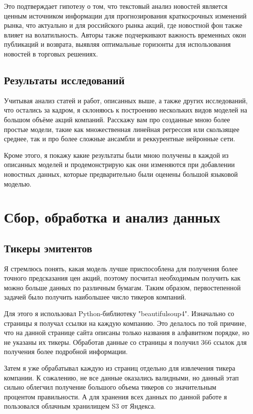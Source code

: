 \documentclass[12pt, a4paper]{article}
\begin{document}
Это подтверждает гипотезу о том, что текстовый анализ новостей является ценным источником информации для прогнозирования краткосрочных изменений рынка, что актуально и для российского рынка акций, где новостной фон также влияет на волатильность. Авторы также подчеркивают важность временных окон публикаций и возврата, выявляя оптимальные горизонты для использования новостей в торговых решениях. 

\subsection{Результаты исследований}
Учитывая анализ статей и работ, описанных выше, а также других исследований, что остались за кадром, я склоняюсь к построению нескольких видов моделей на большом объёме акций компаний. Расскажу вам про созданные мною более простые модели, такие как множественная линейная регрессия или скользящее среднее, так и про более сложные ансамбли и реккурентные нейронные сети.

Кроме этого, я покажу какие результаты были мною получены в каждой из описанных моделей и продемонстрирую как они изменяются при добавлении новостных данных, которые предварительно были оценены большой языковой моделью.

\section{Сбор, обработка и анализ данных}
\subsection{Тикеры эмитентов}
Я стремлюсь понять, какая модель лучше приспособлена для получения более точного предсказания цен акций, поэтому посчитал необходимым получить как можно больше данных по различным бумагам. Таким образом, первостепенной задачей было получить наибольшее число тикеров компаний.

Для этого я использовал Python-библиотеку "beautifulsoup4". Изначально со страницы \cite{secids} я получал ссылки на каждую компанию. Это делалось по той причине, что на данной странице сайта описаны только названия в алфавитном порядке, но не указаны их тикеры. Обработав данные со страницы я получил 366 ссылок для получения более подробной информации.

Затем я уже обрабатывал каждую из страниц отдельно для извлечения тикера компании. К сожалению, не все данные оказались валидными, но данный этап сильно облегчил получение большого объема тикеров со значительным процентом правильности. А для хранения всех данных по данной работе я пользовался облачным хранилищем S3 от Яндекса.
\end{document}

